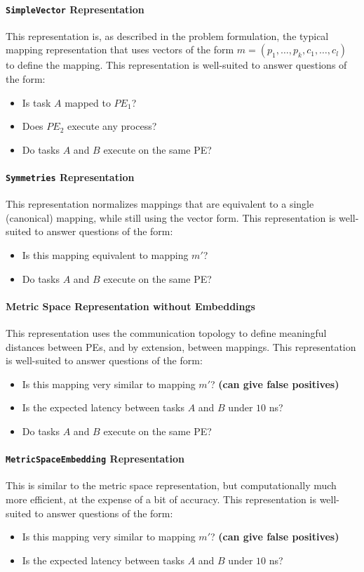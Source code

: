 \paragraph{\texttt{SimpleVector} Representation}
This representation is, as described in the problem formulation, the typical mapping representation that uses vectors of the form $ m = (p_1,\ldots,p_k,c_1,\ldots,c_l)$ to define the mapping.
This representation is well-suited to answer questions of the form:
\begin{itemize}
  \item Is task $A$ mapped to $PE_1$?
  \item Does $PE_2$ execute any process?
 \item Do tasks $A$ and $B$ execute on the same PE?
\end{itemize}

\paragraph{\texttt{Symmetries} Representation}
This representation normalizes mappings that are equivalent to a single (canonical) mapping, while still using the vector form.
This representation is well-suited to answer questions of the form:
\begin{itemize}
\item Is this mapping equivalent to mapping $m'$?
\item Do tasks $A$ and $B$ execute on the same PE?
\end{itemize}

\paragraph{Metric Space Representation without Embeddings}
This representation uses the communication topology to define meaningful distances between PEs, and by extension, between mappings.
This representation is well-suited to answer questions of the form:
\begin{itemize}
\item Is this mapping very similar to mapping $m'$? \textbf{(can give false positives)}
\item Is the expected latency between tasks $A$ and $B$ under $10$ ns?
\item Do tasks $A$ and $B$ execute on the same PE?
\end{itemize}

\paragraph{\texttt{MetricSpaceEmbedding} Representation}
This is similar to the metric space representation, but computationally much more efficient, at the expense of a bit of accuracy.
This representation is well-suited to answer questions of the form:
\begin{itemize}
\item Is this mapping very similar to mapping $m'$? \textbf{(can give false positives)}
\item Is the expected latency between tasks $A$ and $B$ under $10$ ns?
\end{itemize}

